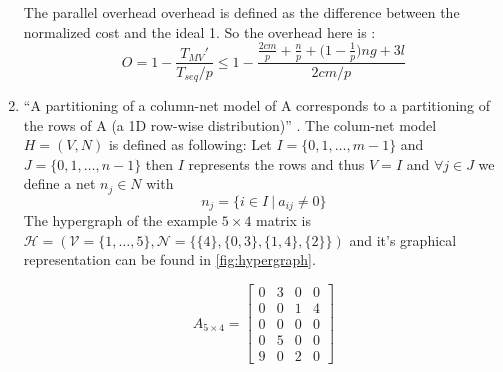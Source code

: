 \documentclass[../main.tex]{subfiles}
\begin{document}
\begin{solution}
\begin{enumerate}
\begin{equation}
		\end{equation}
			The parallel overhead overhead is defined as the difference between the normalized cost and the ideal 1. So the overhead here is \cite[p.~141]{bisseling04}:
			\begin{equation}
				O = 1 - \frac{T_{MV}'}{T_{seq}/p} \leq 1 - \frac{\frac{2cm}{p} + \frac{n}{p} + \Big(1 - \frac{1}{p} \Big) ng + 3l}{2cm/p}
			\end{equation}
	\item ``A partitioning of a column-net model of A corresponds to a partitioning of the rows of A (a 1D row-wise distribution)'' \cite{slides6}. The colum-net model $H=(V,N)$ is defined as following: Let $I = \{0,1,\ldots,m-1\}$ and $J = \{0,1,\ldots,n-1\}$ then $I$ represents the rows and thus $V = I$ and $\forall j \in J$ we define a net $n_j \in N$ with
	\begin{equation}
		n_j = \{i \in I ~|~ a_{ij} \neq 0\}
	\end{equation}
	The hypergraph of the example $5 \times 4$ matrix is $\mathcal{H}=(\mathcal{V} =\{1,\ldots,5\},\mathcal{N} = \{\{4\},\{0, 3\},\{1,4\},\{2\}\})$ and it's graphical representation can be found in \autoref{fig:hypergraph}.

	\begin{equation}
		A_{5\times4} = \begin{bmatrix}
		0 & 3 & 0 & 0 \\
		0 & 0 & 1 & 4 \\
		0 & 0 & 0 & 0 \\
		0 & 5 & 0 & 0 \\
		9 & 0 & 2 & 0
		\end{bmatrix}
	\end{equation}

	\begin{figure}[H]
\end{figure}
\end{enumerate}
\end{solution}
\end{document}
